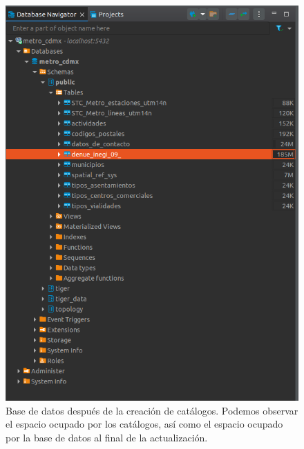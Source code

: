 \documentclass{article}
\begin{document}
\begin{figure}[t]
    \includegraphics[width=13cm]{figures/bd_actualizada.png}
    \caption{Base de datos después de la creación de catálogos. Podemos observar
    el espacio ocupado por los catálogos, así como el espacio ocupado por la
    base de datos al final de la actualización.}
    \centering
\end{figure}
\end{document}
